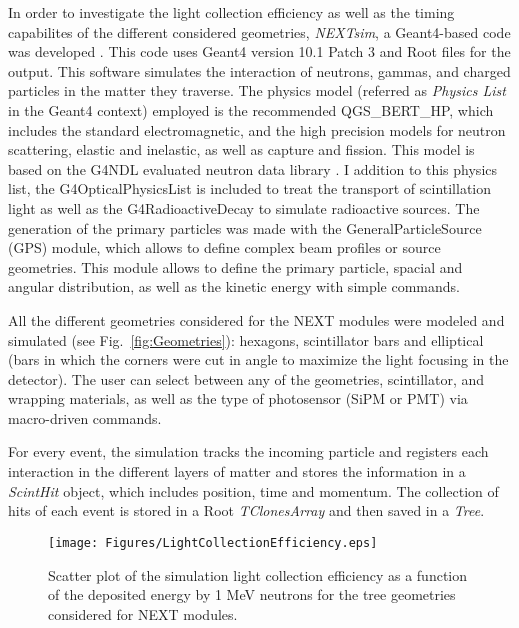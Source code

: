 In order to investigate the light collection efficiency as well as the timing capabilites of the different considered geometries, \emph{NEXTsim}, a {\sc Geant4}-based code was developed \cite{AGOSTINELLI2003250,ALLISON2016186}. This code uses  {\sc Geant4} version 10.1 Patch 3 and {\sc Root} files for the output.
This software simulates the interaction of neutrons, gammas, and charged particles in the matter they traverse. The  physics model (referred as \emph{Physics List} in the {\sc Geant4} context) employed is the recommended QGS\_BERT\_HP, which includes the standard electromagnetic, and the high precision models for neutron scattering, elastic and inelastic, as well as capture and fission.  This model is based on the G4NDL evaluated neutron data library \cite{Apostolakis2009}. I addition to this physics list, the G4OpticalPhysicsList is included to treat the transport of scintillation light as well as the G4RadioactiveDecay to simulate radioactive sources. The generation of the primary particles  was made with the GeneralParticleSource (GPS) module, which allows to define complex beam profiles or source geometries. This module allows to define the primary particle,  spacial and angular distribution, as well as the kinetic energy with simple commands.
 
 All the different geometries considered for the NEXT modules were modeled and simulated (see  Fig.~\ref{fig:Geometries}): hexagons, scintillator bars and elliptical (bars in which the corners were cut in angle to maximize the light focusing in the detector). The user can select between any of the geometries, scintillator, and wrapping materials, as well as the type of photosensor (SiPM or PMT) via macro-driven commands. 

For every event, the simulation tracks the incoming particle and registers each interaction in the different layers of matter and stores the information in a \emph{ScintHit} object, which includes position, time and momentum. The collection of hits of each event is stored in a  {\sc Root} \emph{TClonesArray} and then saved in a \emph{Tree}.

\begin{figure}[hbt]
\centering
\texttt{[image: Figures/LightCollectionEfficiency.eps]}
\caption{Scatter plot of the simulation  light collection efficiency as a function of the deposited energy by 1 MeV neutrons for the tree geometries considered for NEXT modules.}
\label{fig:Efficiency}
\end{figure}


